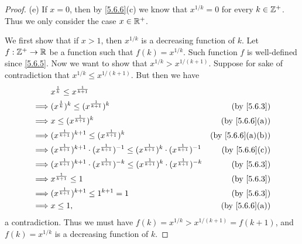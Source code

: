\begin{proof}{(e)}
  If \(x = 0\), then by \cref{5.6.6}(c) we know that \(x^{1 / k} = 0\) for every \(k \in \mathbb{Z}^+\).
  Thus we only consider the case \(x \in \mathbb{R}^+\).

  We first show that if \(x > 1\), then \(x^{1 / k}\) is a decreasing function of \(k\).
  Let \(f : \mathbb{Z}^+ \to \mathbb{R}\) be a function such that \(f(k) = x^{1 / k}\).
  Such function \(f\) is well-defined since \cref{5.6.5}.
  Now we want to show that \(x^{1 / k} > x^{1 / (k + 1)}\).
  Suppose for sake of contradiction that \(x^{1 / k} \leq x^{1 / (k + 1)}\).
  But then we have
  \begin{align*}
             & x^{\frac{1}{k}} \leq x^{\frac{1}{k + 1}}                                                                                                                      \\
    \implies & (x^{\frac{1}{k}})^k \leq (x^{\frac{1}{k + 1}})^k                                                                             & \text{(by \cref{5.6.3})}       \\
    \implies & x \leq (x^{\frac{1}{k + 1}})^k                                                                                               & \text{(by \cref{5.6.6}(a))}    \\
    \implies & (x^{\frac{1}{k + 1}})^{k + 1} \leq (x^{\frac{1}{k + 1}})^k                                                                   & \text{(by \cref{5.6.6}(a)(b))} \\
    \implies & (x^{\frac{1}{k + 1}})^{k + 1} \cdot (x^{\frac{1}{k + 1}})^{-1} \leq (x^{\frac{1}{k + 1}})^k \cdot (x^{\frac{1}{k + 1}})^{-1} & \text{(by \cref{5.6.6}(c))}    \\
    \implies & (x^{\frac{1}{k + 1}})^{k + 1} \cdot (x^{\frac{1}{k + 1}})^{-k} \leq (x^{\frac{1}{k + 1}})^k \cdot (x^{\frac{1}{k + 1}})^{-k} & \text{(by \cref{5.6.3})}       \\
    \implies & x^{\frac{1}{k + 1}} \leq 1                                                                                                   & \text{(by \cref{5.6.3})}       \\
    \implies & (x^{\frac{1}{k + 1}})^{k + 1} \leq 1^{k + 1} = 1                                                                             & \text{(by \cref{5.6.3})}       \\
    \implies & x \leq 1,                                                                                                                    & \text{(by \cref{5.6.6}(a))}
  \end{align*}
  a contradiction.
  Thus we must have \(f(k) = x^{1 / k} > x^{1 / (k + 1)} = f(k + 1)\), and \(f(k) = x^{1 / k}\) is a decreasing function of \(k\).


\end{proof}
